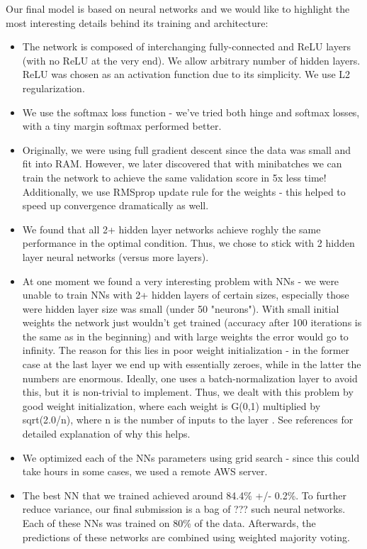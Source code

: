 \documentclass[10pt,conference,compsocconf]{IEEEtran}
\begin{document}
Our final model is based on neural networks and we would like to highlight the most interesting details behind its training and architecture:
\begin{itemize}
\item The network is composed of interchanging fully-connected and ReLU \cite{relu} layers (with no ReLU at the very end). We allow arbitrary number of hidden layers. ReLU was chosen as an activation function due to its simplicity. We use L2 regularization.
\item We use the softmax \cite{softmax} loss function - we've tried both hinge and softmax losses, with a tiny margin softmax performed better.
\item Originally, we were using full gradient descent since the data was small and fit into RAM. However, we later discovered that with minibatches we can train the network to achieve the same validation score in 5x less time! Additionally, we use RMSprop \cite{rmsprop} update rule for the weights - this helped to speed up convergence dramatically as well.
\item We found that all 2+ hidden layer networks achieve roghly the same performance in the optimal condition. Thus, we chose to stick with 2 hidden layer neural networks (versus more layers).
\item At one moment we found a very interesting problem with NNs - we were unable to train NNs with 2+ hidden layers of certain sizes, especially those were hidden layer size was small (under 50 "neurons"). With small initial weights the network just wouldn't get trained (accuracy after 100 iterations is the same as in the beginning) and with large weights the error would go to infinity. The reason for this lies in poor weight initialization - in the former case at the last layer we end up with essentially zeroes, while in the latter the numbers are enormous. Ideally, one uses a batch-normalization layer to avoid this, but it is non-trivial to implement. Thus, we dealt with this problem by good weight initialization, where each weight is G(0,1) multiplied by sqrt(2.0/n), where n is the number of inputs to the layer \cite{calibratin_variance_blog} \cite{calibrating_variance_paper}. See references for detailed explanation of why this helps.
\item We optimized each of the NNs parameters using grid search - since this could take hours in some cases, we used a remote AWS server.
\item The best NN that we trained achieved around 84.4\% +/- 0.2\%. To further reduce variance, our final submission is a bag of ??? such neural networks. Each of these NNs was trained on 80\% of the data. Afterwards, the predictions of these networks are combined using weighted majority voting.
\end{itemize}
\end{document}
